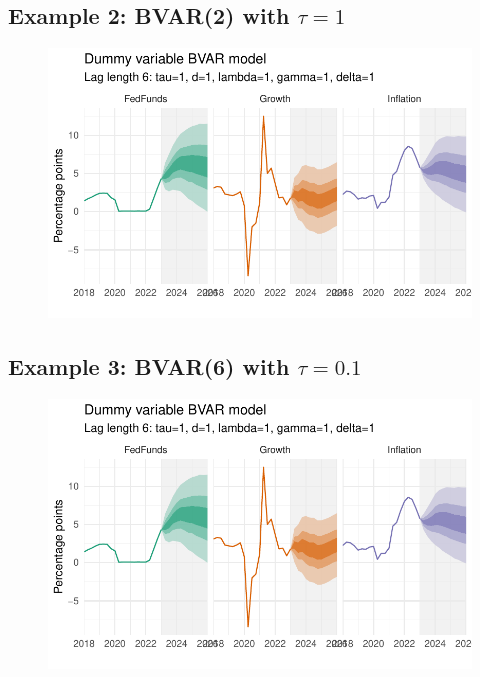 \documentclass[
  letterpaper,
]{book}
\begin{document}
\hypertarget{example-2-bvar2-with-tau1}{%
\subsection{\texorpdfstring{Example 2: BVAR(2) with
\(\tau=1\)}{Example 2: BVAR(2) with \textbackslash tau=1}}\label{example-2-bvar2-with-tau1}}

\begin{figure}

{\centering \includegraphics{BVAR_files/figure-pdf/estim-1.pdf}

}

\end{figure}

\hypertarget{example-3-bvar6-with-tau0.1}{%
\subsection{\texorpdfstring{Example 3: BVAR(6) with
\(\tau=0.1\)}{Example 3: BVAR(6) with \textbackslash tau=0.1}}\label{example-3-bvar6-with-tau0.1}}

\begin{figure}

{\centering \includegraphics{BVAR_files/figure-pdf/estim-1.pdf}

}

\end{figure}
\end{document}
